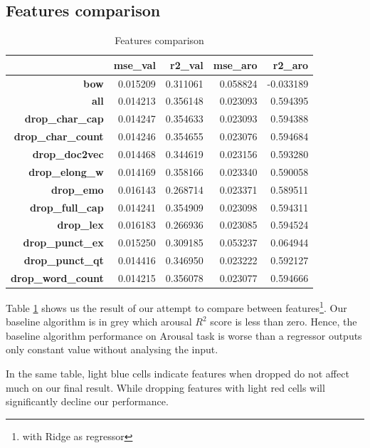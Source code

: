 \documentclass[12pt]{article}
\begin{document}
\subsection{Features comparison}
\begin{table}[H]
	\centering
	\begin{tabular}{| r | r | r | r | r |}
		\hline
		& \textbf{mse\_val} & \textbf{r2\_val} & \textbf{mse\_aro} & \textbf{r2\_aro}\\
		\hline
		\rowcolor{gray!50} \textbf{bow} & 0.015209 & 0.311061 & 0.058824 & -0.033189\\
		\textbf{all} & 0.014213 & \cellcolor{blue!25}0.356148 & 0.023093 & \cellcolor{blue!25}0.594395\\
		\textbf{drop\_char\_cap} & 0.014247 & 0.354633 & 0.023093 & 0.594388\\
		\textbf{drop\_char\_count} & 0.014246 & 0.354655 & 0.023076 & \cellcolor{blue!25}0.594684\\
		\textbf{drop\_doc2vec} & 0.014468 & 0.344619 & 0.023156 & 0.593280\\
		\textbf{drop\_elong\_w} & 0.014169 & \cellcolor{blue!25}0.358166 & 0.023340 & 0.590058\\
		\textbf{drop\_emo} & 0.016143 & \cellcolor{red!25}0.268714 & 0.023371 & 0.589511\\
		\textbf{drop\_full\_cap} & 0.014241 & 0.354909 & 0.023098 & 0.594311\\
		\textbf{drop\_lex} & 0.016183 & \cellcolor{red!25}0.266936 & 0.023085 & 0.594524\\
		\textbf{drop\_punct\_ex} & 0.015250 & 0.309185 & 0.053237 & \cellcolor{red!25}0.064944\\
		\textbf{drop\_punct\_qt} & 0.014416 & 0.346950 & 0.023222 & 0.592127\\
		\textbf{drop\_word\_count} & 0.014215 & \cellcolor{blue!25}0.356078 & 0.023077 & \cellcolor{blue!25}0.594666\\
		\hline
	\end{tabular}
	\caption{Features comparison}
	\label{tb:features_comp}
\end{table}

Table \ref{tb:features_comp} shows us the result of our attempt to compare between features\footnote{with Ridge as regressor}. Our baseline algorithm is in grey which arousal $R^2$ score is less than zero. Hence, the baseline algorithm performance on Arousal task is worse than a regressor outputs only constant value without analysing the input.

In the same table, light blue cells indicate features when dropped do not affect much on our final result. While dropping features with light red cells will significantly decline our performance.
\end{document}
